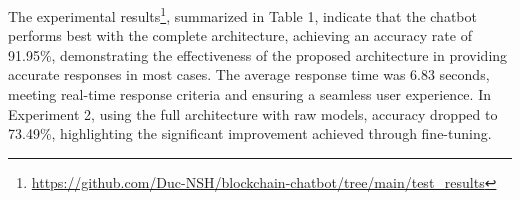 \documentclass[runningheads]{llncs}
\begin{document}
The experimental results\footnote{\url{https://github.com/Duc-NSH/blockchain-chatbot/tree/main/test_results}}, summarized in Table 1, indicate that the chatbot performs best with the complete architecture, achieving an accuracy rate of 91.95\%, demonstrating the effectiveness of the proposed architecture in providing accurate responses in most cases. The average response time was 6.83 seconds, meeting real-time response criteria and ensuring a seamless user experience. In Experiment 2, using the full architecture with raw models, accuracy dropped to 73.49\%, highlighting the significant improvement achieved through fine-tuning.


\end{document}
